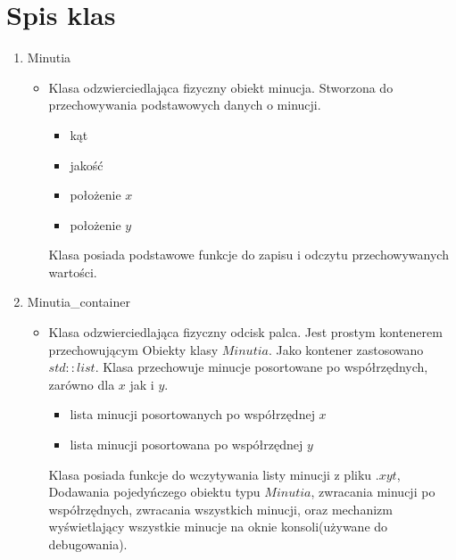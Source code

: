 \section {Spis klas}
\begin{enumerate}
	\item Minutia
	\renewcommand*{\labelitemi}{\bullet}
	\begin{itemize}
		\item Klasa odzwierciedlająca fizyczny obiekt minucja. Stworzona do przechowywania podstawowych danych o minucji.
		\begin{itemize}
			\item kąt
			\item jakość
			\item położenie $x$
			\item położenie $y$
		\end{itemize}
		Klasa posiada podstawowe funkcje do zapisu i odczytu przechowywanych wartości.
	\end{itemize}
	\item Minutia\_container
	\renewcommand*{\labelitem}{\bullet}
	\begin{itemize}
		\item Klasa odzwierciedlająca fizyczny odcisk palca. Jest prostym kontenerem przechowującym Obiekty klasy $Minutia$. Jako kontener zastosowano $std::list$. Klasa przechowuje minucje posortowane po 
		współrzędnych, zarówno dla $x$ jak i $y$. 
		\begin{itemize}
			\item lista minucji posortowanych po współrzędnej $x$
			\item lista minucji posortowana po współrzędnej $y$
		\end{itemize}
		Klasa posiada funkcje do wczytywania listy minucji z pliku $.xyt$, Dodawania pojedyńczego obiektu typu $Minutia$, zwracania minucji po współrzędnych, zwracania wszystkich minucji, oraz mechanizm 
		wyświetlający wszystkie minucje na oknie konsoli(używane do debugowania). 
	\end{itemize}



\end{enumerate}
